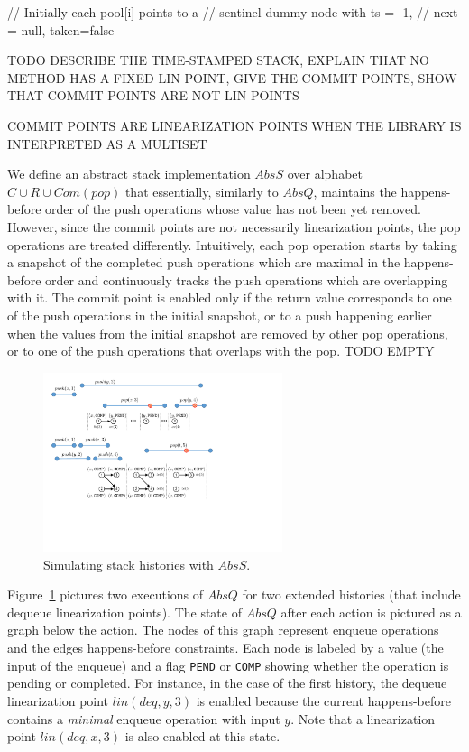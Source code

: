 // Initially each pool[i] points to a 
// sentinel dummy node with ts = -1, 
// next = null, taken=false


TODO DESCRIBE THE TIME-STAMPED STACK, EXPLAIN THAT NO METHOD HAS A FIXED LIN POINT, GIVE THE COMMIT POINTS, SHOW THAT COMMIT POINTS ARE NOT LIN POINTS

COMMIT POINTS ARE LINEARIZATION POINTS WHEN THE LIBRARY IS INTERPRETED AS A MULTISET

We define an abstract stack implementation $AbsS$ over alphabet $C\cup R\cup Com(pop)$ that essentially, similarly to $AbsQ$, maintains the happens-before order of the push operations whose value has not been yet removed. However, since the commit points are not necessarily linearization points, the pop operations are treated differently. Intuitively, each pop operation starts by taking a snapshot of the completed push operations which are maximal in the happens-before order and continuously tracks the push operations which are overlapping with it. The commit point is enabled only if the return value corresponds to one of the push operations in the initial snapshot, or to a push happening earlier when the values from the initial snapshot are removed by other pop operations, or to one of the push operations that overlaps with the pop. TODO EMPTY

\begin{figure}
\vspace{-8mm}
\includegraphics[width=7cm]{fig-stack.pdf}
%
\vspace{-5mm}
\caption{Simulating stack histories with $AbsS$.}
\label{fig:stackSim}
\vspace{-6mm}
\end{figure}
Figure~\ref{fig:stackSim} pictures two executions of $AbsQ$ for two extended histories (that include dequeue linearization points). The state of $AbsQ$ after each action is pictured as a graph below the action. The nodes of this graph represent enqueue operations and the edges happens-before constraints. Each node is labeled by a value (the input of the enqueue) and a flag {\tt PEND} or {\tt COMP} showing whether the operation is pending or completed. For instance, in the case of the first history, the dequeue linearization point $lin(deq,y,3)$ is enabled because the current happens-before contains a \emph{minimal} enqueue operation with input $y$. Note that a linearization point $lin(deq,x,3)$ is also enabled at this state.


